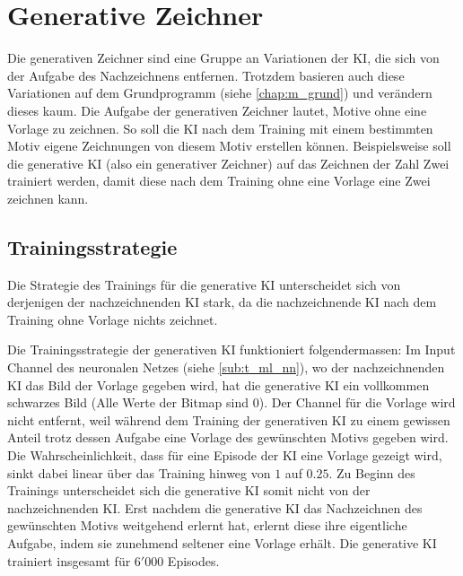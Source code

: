 \section{Generative Zeichner}\label{chap:m_gen} Die generativen Zeichner sind
eine Gruppe an Variationen der KI, die sich von der Aufgabe des Nachzeichnens
entfernen. Trotzdem basieren auch diese Variationen auf dem Grundprogramm (siehe
\ref{chap:m_grund}) und verändern dieses kaum. Die Aufgabe der generativen
Zeichner lautet, Motive ohne eine Vorlage zu zeichnen. So soll die KI nach dem
Training mit einem bestimmten Motiv eigene Zeichnungen von diesem Motiv
erstellen können. Beispielsweise soll die generative KI (also ein generativer
Zeichner) auf das Zeichnen der Zahl Zwei trainiert werden, damit diese nach dem
Training ohne eine Vorlage eine Zwei zeichnen kann.

\subsection{Trainingsstrategie}\label{sub:m_gen_train} Die Strategie des
Trainings für die generative KI unterscheidet sich von derjenigen der
nachzeichnenden KI stark, da die nachzeichnende KI nach dem Training ohne
Vorlage nichts zeichnet.

Die Trainingsstrategie der generativen KI funktioniert folgendermassen: Im Input
Channel des neuronalen Netzes (siehe \ref{sub:t_ml_nn}), wo der
nachzeichnenden KI das Bild der Vorlage gegeben wird, hat die generative KI ein
vollkommen schwarzes Bild (Alle Werte der Bitmap sind $0$). Der Channel für die
Vorlage wird nicht entfernt, weil während dem Training der generativen KI zu
einem gewissen Anteil trotz dessen Aufgabe eine Vorlage des gewünschten Motivs
gegeben wird. Die Wahrscheinlichkeit, dass für eine Episode der KI eine Vorlage
gezeigt wird, sinkt dabei linear über das Training hinweg von $1$ auf $0.25$. Zu
Beginn des Trainings unterscheidet sich die generative KI somit nicht von der
nachzeichnenden KI. Erst nachdem die generative KI das Nachzeichnen des
gewünschten Motivs weitgehend erlernt hat, erlernt diese ihre eigentliche
Aufgabe, indem sie zunehmend seltener eine Vorlage erhält. Die generative KI
trainiert insgesamt für $6'000$ Episodes.

